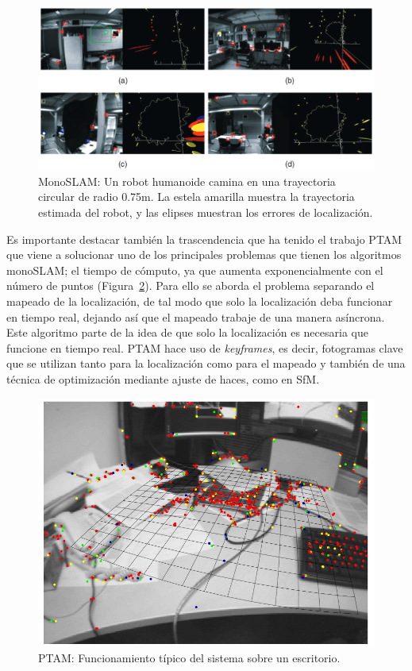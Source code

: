 \begin{figure}[th]
\centering
\includegraphics[scale=0.35]{Figures/monoslam.png}
\decoRule
\caption[MonoSLAM]{MonoSLAM: Un robot humanoide camina en una trayectoria circular de radio 0.75m. La estela amarilla muestra la trayectoria estimada del robot, y las elipses muestran los errores de localización.}
\label{fig:Monoslam}
\end{figure}

Es importante destacar también la trascendencia que ha tenido el trabajo PTAM \parencite{Reference6} que viene a solucionar uno de los principales problemas que tienen los algoritmos monoSLAM; el tiempo de cómputo, ya que aumenta exponencialmente con el número de puntos (Figura~\ref{fig:Ptam}). Para ello se aborda el problema separando el mapeado de la localización, de tal modo que solo la localización deba funcionar en tiempo real, dejando así que el mapeado trabaje de una manera asíncrona. Este algoritmo parte de la idea de que solo la localización es necesaria que funcione en tiempo real. PTAM hace uso de \textit{keyframes}, es decir, fotogramas clave que se utilizan tanto para la localización como para el mapeado y también de una técnica de optimización mediante ajuste de haces, como en SfM.

\begin{figure}[th]
\centering
\includegraphics[scale=0.4]{Figures/ptam.png}
\decoRule
\caption[PTAM]{PTAM: Funcionamiento típico del sistema sobre un escritorio.}
\label{fig:Ptam}
\end{figure}

